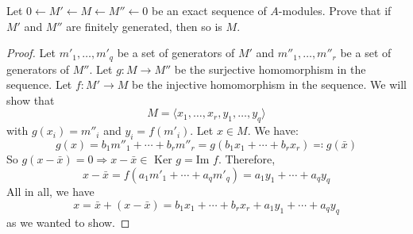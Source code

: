 \begin{problem}

    Let $ 0  \leftarrow M' \leftarrow M \leftarrow M'' \leftarrow 0$ be an exact sequence of $A$-modules.
    Prove that if $M'$ and $M''$ are finitely generated, then so is $M$.

    \begin{sol}
        \begin{proof}
            Let $m'_1, \dots, m'_q$ be a set of generators of $M'$ and
            $m''_1, \dots, m''_r$ be a set of generators of $M''$.
            Let $g: M \rightarrow M''$ be the surjective homomorphism in the sequence.
            Let $f: M' \rightarrow M$ be the injective homomorphism in the sequence.
            We will show that
            \[M = \langle x_1, \ldots, x_r, y_1, \ldots, y_q\rangle\]
            with $g(x_i) = m''_i$ and $y_i = f(m'_i)$.
            Let $x \in M$.
            We have:
            \[g(x) = b_1 m''_1 + \cdots + b_r m''_r = g(b_1 x_1 + \cdots + b_r x_r) \eqqcolon g(\bar{x})\]
            So $g(x - \bar{x}) = 0 \Rightarrow x - \bar{x} \in \text{ Ker } g = \text{Im } f$.
            Therefore,
            \[x - \bar{x} = f(a_1 m'_1 + \cdots + a_q m'_q) = a_1 y_1 + \cdots + a_q y_q\]
            All in all, we have
            \[x = \bar{x} + (x - \bar{x}) = b_1 x_1 + \cdots + b_r x_r + a_1 y_1 + \cdots + a_q y_q \]
            as we wanted to show.


        \end{proof}
    \end{sol}

\end{problem}
